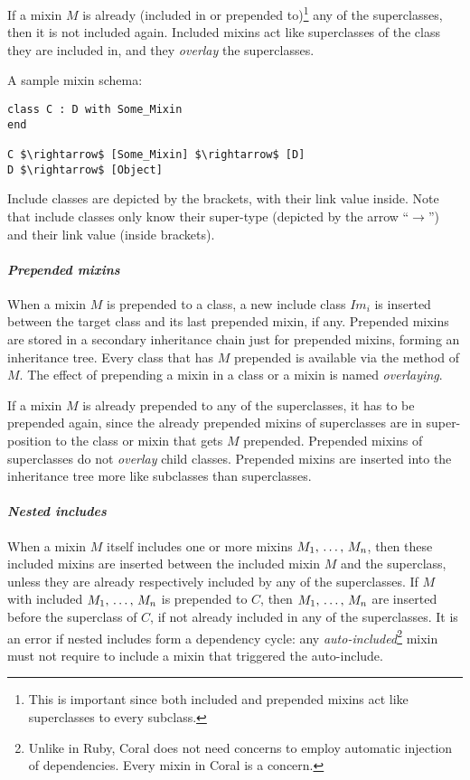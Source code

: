 If a mixin $M$ is already (included in or prepended to)\footnote{This is important since both included and prepended mixins act like superclasses to every subclass.} any of the superclasses, then it is not included again. Included mixins act like superclasses of the class they are included in, and they {\em overlay} the superclasses. 

\example A sample mixin schema:
\begin{lstlisting}
class C : D with Some_Mixin
end

C $\rightarrow$ [Some_Mixin] $\rightarrow$ [D]
D $\rightarrow$ [Object]
\end{lstlisting}
Include classes are depicted by the brackets, with their link value inside. Note that include classes only know their super-type (depicted by the arrow ``$\rightarrow$'') and their link value (inside brackets). 

\paragraph{\em Prepended mixins}
When a mixin $M$ is prepended to a class, a new include class $Im_i$ is inserted between the target class and its last prepended mixin, if any. Prepended mixins are stored in a secondary inheritance chain just for prepended mixins, forming an inheritance tree. Every class that has $M$ prepended is available via the  method of $M$. The effect of prepending a mixin in a class or a mixin is named {\em overlaying}. 

If a mixin $M$ is already prepended to any of the superclasses, it has to be prepended again, since the already prepended mixins of superclasses are in super-position to the class or mixin that gets $M$ prepended. Prepended mixins of superclasses do not {\em overlay} child classes. Prepended mixins are inserted into the inheritance tree more like subclasses than superclasses. 

\paragraph{\em Nested includes}
When a mixin $M$ itself includes one or more mixins $M_1 ,\, \ldots ,\, M_n$, then these included mixins are inserted between the included mixin $M$ and the superclass, unless they are already respectively included by any of the superclasses. If $M$ with included $M_1 ,\, \ldots ,\, M_n$ is prepended to $C$, then $M_1 ,\, \ldots ,\, M_n$ are inserted before the superclass of $C$, if not already included in any of the superclasses. It is an error if nested includes form a dependency cycle: any {\em auto-included}\footnote{Unlike in Ruby, Coral does not need concerns to employ automatic injection of dependencies. Every mixin in Coral is a concern.} mixin must not require to include a mixin that triggered the auto-include. 

